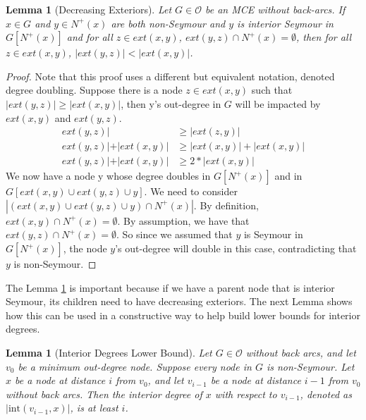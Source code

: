\documentclass[AMS, Times1COL]{article} %
\newtheorem{lemma}[theorem]{Lemma}
\theoremstyle{definition}
\begin{document}
	\begin{lemma}[Decreasing Exteriors]
		Let $G \in \mathcal{O}$ be an MCE without back-arcs. If $x \in G$ and $y \in N^+(x)$ are both non-Seymour and $y$ is interior Seymour in $G[N^+(x)]$ and for all $z \in ext(x, y)$, $ext(y, z) \cap N^+ (x) = \emptyset$, then for all $z \in ext(x, y)$, $|ext(y, z)| < |ext(x, y)|$.\label{eub}
	\end{lemma}
	\begin{proof}
		Note that this proof uses a different but equivalent notation, denoted degree doubling. Suppose there is a node $z \in ext(x, y)$ such that $|ext (y, z)| \ge |ext (x, y)|$, then y’s out-degree in $G$ will be impacted by $ext (x, y)$ and $ext (y, z)$.
		\begin{align}
			ext (y, z)| &\ge |ext (z, y)| \\
			ext (y, z)| + |ext (x, y)| &\ge |ext (x, y)| + |ext (x, y)|\\
			ext (y, z)| + |ext (x, y)| &\ge 2 * |ext (x, y)|
		\end{align}
		We now have a node y whose degree doubles in $G[N^+ (x)]$ and in $G[ext (x, y) \cup ext (y, z) \cup y]$. We need
		to consider$|(ext (x, y) \cup ext (y, z) \cup y) \cap N^+ (x)|$. By definition, $ext (x, y) \cap N^+ (x) = \emptyset$. By assumption,
		we have that $ext (y, z) \cap N^+ (x) = \emptyset$. So since we assumed that $y$ is Seymour in $G[N^+ (x)]$, the node $y$’s out-degree will double in this case, contradicting that $y$ is non-Seymour. 
	\end{proof}
		
	The Lemma \ref{eub} is important because if we have a parent node that is interior Seymour, its children need to have decreasing exteriors. The next Lemma shows how this can be used in a constructive way to help build lower bounds for interior degrees. 
	
	\begin{lemma}[Interior Degrees Lower Bound]
		Let $G\in \mathcal{O}$ without back arcs, and let $v_0$ be a minimum out-degree node. 
		Suppose every node in $G$ is non-Seymour. 
		Let $x$ be a node at distance $i$ from $v_0$, and let $v_{i-1}$ be a node at distance $i-1$ from $v_0$ without back arcs. Then the interior degree of $x$ with respect to $v_{i-1}$, denoted as $|\text{int}(v_{i-1},x)|$, is at least $i$. 
		\label{ilb}
	\end{lemma}
	
\end{document}
